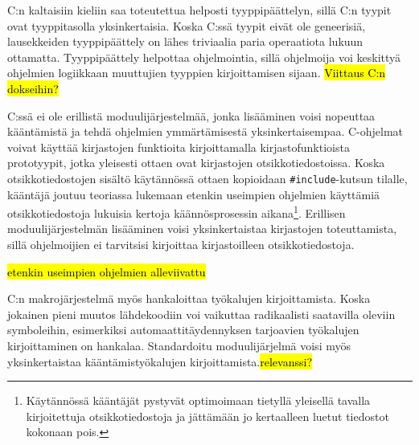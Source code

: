 C:n kaltaisiin kieliin saa toteutettua helposti tyyppipäättelyn, sillä C:n
tyypit ovat tyyppitasolla yksinkertaisia. Koska C:ssä tyypit eivät ole
geneerisiä, lausekkeiden tyyppipäättely on lähes triviaalia paria operaatiota
lukuun ottamatta. Tyyppipäättely helpottaa ohjelmointia, sillä ohjelmoija
voi keskittyä ohjelmien logiikkaan muuttujien tyyppien kirjoittamisen sijaan.
\hl{Viittaus C:n dokseihin?}

C:ssä ei ole erillistä moduulijärjestelmää, jonka lisääminen voisi nopeuttaa
kääntämistä ja tehdä ohjelmien ymmärtämisestä yksinkertaisempaa. C-ohjelmat
voivat käyttää kirjastojen funktioita kirjoittamalla kirjastofunktioista
prototyypit, jotka yleisesti ottaen ovat kirjastojen otsikkotiedostoissa. Koska
otsikkotiedostojen sisältö käytännössä ottaen kopioidaan
\texttt{\#include}-kutsun tilalle, kääntäjä joutuu teoriassa lukemaan etenkin
useimpien ohjelmien käyttämiä otsikkotiedostoja lukuisia kertoja
käännösprosessin aikana\footnote{Käytännössä kääntäjät pystyvät optimoimaan
tietyllä yleisellä tavalla kirjoitettuja otsikkotiedostoja ja jättämään jo
kertaalleen luetut tiedostot kokonaan pois.}. Erillisen moduulijärjestelmän
lisääminen voisi yksinkertaistaa kirjastojen toteuttamista, sillä ohjelmoijien
ei tarvitsisi kirjoittaa kirjastoilleen otsikkotiedostoja. 

\hl{etenkin useimpien ohjelmien alleviivattu}

C:n makrojärjestelmä myös hankaloittaa työkalujen kirjoittamista. Koska
jokainen pieni muutos lähdekoodiin voi vaikuttaa radikaalisti saatavilla
oleviin symboleihin, esimerkiksi automaattitäydennyksen tarjoavien työkalujen
kirjoittaminen on hankalaa. Standardoitu moduulijärjelmä voisi myös
yksinkertaistaa kääntämistyökalujen kirjoittamista.\hl{relevanssi?}

